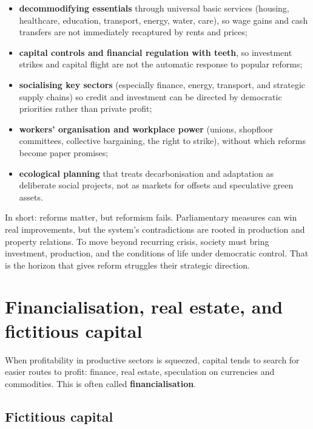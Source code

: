 \begin{itemize}[leftmargin=1.5em]
  \item \textbf{decommodifying essentials} through universal basic services (housing, healthcare, education, transport, energy,
  water, care), so wage gains and cash transfers are not immediately recaptured by rents and prices;
  \item \textbf{capital controls and financial regulation with teeth}, so investment strikes and capital flight are not the
  automatic response to popular reforms;
  \item \textbf{socialising key sectors} (especially finance, energy, transport, and strategic supply chains) so credit and
  investment can be directed by democratic priorities rather than private profit;
  \item \textbf{workers' organisation and workplace power} (unions, shopfloor committees, collective bargaining, the right to
  strike), without which reforms become paper promises;
  \item \textbf{ecological planning} that treats decarbonisation and adaptation as deliberate social projects, not as markets
  for offsets and speculative green assets.
\end{itemize}

In short: reforms matter, but reformism fails. Parliamentary measures can win real improvements, but the system's contradictions
are rooted in production and property relations. To move beyond recurring crisis, society must bring investment, production, and
the conditions of life under democratic control. That is the horizon that gives reform struggles their strategic direction.

\section{Financialisation, real estate, and fictitious capital}
\label{sec:financialisation}

When profitability in productive sectors is squeezed, capital tends to
search for easier routes to profit: finance, real estate, speculation on
currencies and commodities. This is often called \textbf{financialisation}.

\subsection{Fictitious capital}
\label{sec:fictitious-capital}

